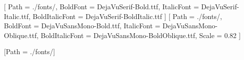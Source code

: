 %
\usepackage{fontspec}
\setmainfont{DejaVuSerif.ttf}[
  Path = ./fonts/,
  BoldFont = DejaVuSerif-Bold.ttf,
  ItalicFont = DejaVuSerif-Italic.ttf,
  BoldItalicFont = DejaVuSerif-BoldItalic.ttf
]
\setmonofont{DejaVuSansMono.ttf}[
  Path = ./fonts/,
  BoldFont = DejaVuSansMono-Bold.ttf,
  ItalicFont = DejaVuSansMono-Oblique.ttf,
  BoldItalicFont = DejaVuSansMono-BoldOblique.ttf,
  Scale = 0.82
]
\usepackage{unicode-math}
[Path = ./fonts/]

\usepackage{fancyvrb}

\usepackage{hyperref}
\hypersetup{
  colorlinks=true,
  linkcolor=blue!40!black,
  citecolor=blue!40!black,
  urlcolor=blue!60!black
}

\AtBeginDocument{%
  \def\UrlBreaks{\do\/\do\.\do\?}%
  \def\UrlBigBreaks{\do\:}%
  \def\UrlNoBreaks{\do\-}%
}

